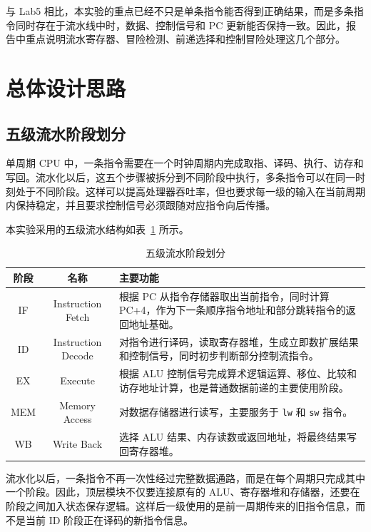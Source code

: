 \documentclass[UTF8,zihao=-4]{ctexart}
\begin{document}
与 Lab5 相比，本实验的重点已经不只是单条指令能否得到正确结果，而是多条指令同时存在于流水线中时，数据、控制信号和 PC 更新能否保持一致。因此，报告中重点说明流水寄存器、冒险检测、前递选择和控制冒险处理这几个部分。

\section{总体设计思路}

\subsection{五级流水阶段划分}

单周期 CPU 中，一条指令需要在一个时钟周期内完成取指、译码、执行、访存和写回。流水化以后，这五个步骤被拆分到不同阶段中执行，多条指令可以在同一时刻处于不同阶段。这样可以提高处理器吞吐率，但也要求每一级的输入在当前周期内保持稳定，并且要求控制信号必须跟随对应指令向后传播。

本实验采用的五级流水结构如表~\ref{tab:stage} 所示。

\begin{table}[H]
  \centering
  \caption{五级流水阶段划分}
  \label{tab:stage}
  \begin{tabular}{c c p{8.5cm}}
    \toprule
    阶段 & 名称 & 主要功能 \\
    \midrule
    IF & Instruction Fetch & 根据 PC 从指令存储器取出当前指令，同时计算 PC+4，作为下一条顺序指令地址和部分跳转指令的返回地址基础。\\
    ID & Instruction Decode & 对指令进行译码，读取寄存器堆，生成立即数扩展结果和控制信号，同时初步判断部分控制流指令。\\
    EX & Execute & 根据 ALU 控制信号完成算术逻辑运算、移位、比较和访存地址计算，也是普通数据前递的主要使用阶段。\\
    MEM & Memory Access & 对数据存储器进行读写，主要服务于 \texttt{lw} 和 \texttt{sw} 指令。\\
    WB & Write Back & 选择 ALU 结果、内存读数或返回地址，将最终结果写回寄存器堆。\\
    \bottomrule
  \end{tabular}
\end{table}

流水化以后，一条指令不再一次性经过完整数据通路，而是在每个周期只完成其中一个阶段。因此，顶层模块不仅要连接原有的 ALU、寄存器堆和存储器，还要在阶段之间加入状态保存逻辑。这样后一级使用的是前一周期传来的旧指令信息，而不是当前 ID 阶段正在译码的新指令信息。
\end{document}
